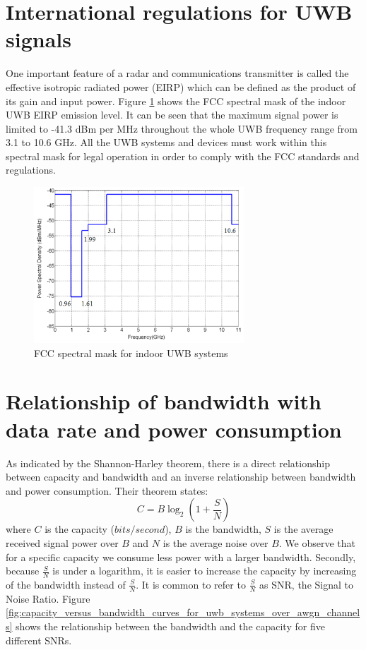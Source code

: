 \documentclass[\main/main.tex]{subfiles}
\begin{document}
\section{International regulations for UWB signals}

One important feature of a radar and communications transmitter is called the effective isotropic radiated power (EIRP) which can be defined as the product of its gain and input power. Figure \ref{fig:fcc_spectral_mask_for_indoor_uwb_systems} shows the FCC spectral mask of the indoor UWB EIRP emission level. It can be seen that the maximum signal power is limited to -41.3 dBm per MHz throughout the whole UWB frequency range from 3.1 to 10.6 GHz. All the UWB systems and devices must work within this spectral mask for legal operation in order to comply with the FCC standards and regulations.

\begin{figure}[H]
    \centering
    \includegraphics[width=0.7\textwidth]{fcc_spectral_mask_for_indoor_uwb_systems}
    \caption{FCC spectral mask for indoor UWB systems}
    \label{fig:fcc_spectral_mask_for_indoor_uwb_systems}
\end{figure}

\section{Relationship of bandwidth with data rate and power consumption}
As indicated by the Shannon-Harley theorem, there is a direct relationship between capacity and bandwidth and an inverse relationship between bandwidth and power consumption. Their theorem states: 
\begin{equation}
    C=B\log_2(1+\frac{S}{N})
\end{equation} where $C$ is the capacity ($bits/second$), $B$ is the bandwidth, $S$ is the average received signal power over $B$ and $N$ is the average noise over $B$. We observe that for a specific capacity we consume less power with a larger bandwidth. Secondly, because $\frac{S}{N}$ is under a logarithm, it is easier to increase the capacity by increasing of the bandwidth instead of $\frac{S}{N}$. It is common to refer to $\frac{S}{N}$ as SNR, the Signal to Noise Ratio. Figure \ref{fig:capacity_versus_bandwidth_curves_for_uwb_systems_over_awgn_channels} shows the relationship between the bandwidth and the capacity for five different SNRs.
\end{document}
